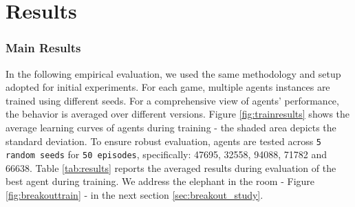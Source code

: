
\chapter{Results}
\label{sec:results}

\subsection{Main Results}\label{sec:results_1}
In the following empirical evaluation, we used the same methodology and setup adopted for initial experiments. For each game, multiple agents instances are trained using different seeds. For a comprehensive view of agents' performance, the behavior is averaged over different versions. Figure \ref{fig:trainresults} shows the average learning curves of agents during training - the shaded area depicts the standard deviation. To ensure robust evaluation, agents are tested across \texttt{5 random seeds} for \texttt{50 episodes}, specifically: 47695, 32558, 94088, 71782 and 66638. Table \ref{tab:results} reports the averaged results during evaluation of the best agent during training. We address the elephant in the room - Figure \ref{fig:breakouttrain} - in the next section \ref{sec:breakout_study}.

